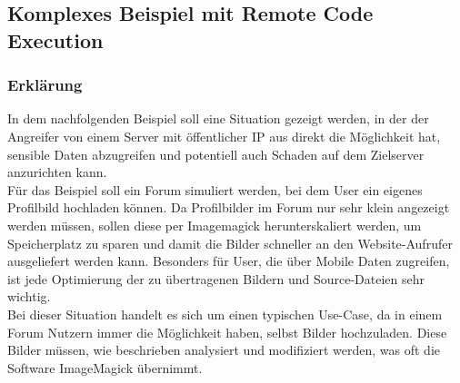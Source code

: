 
\subsection{Komplexes Beispiel mit Remote Code Execution}\label{subsec:komplexes-beispiel-mit-remote-code-execution}

\subsubsection{Erklärung}
In dem nachfolgenden Beispiel soll eine Situation gezeigt werden,
in der der Angreifer von einem Server mit öffentlicher IP aus direkt die Möglichkeit hat,
sensible Daten abzugreifen und potentiell auch Schaden auf dem Zielserver anzurichten kann.\\

Für das Beispiel soll ein Forum simuliert werden, bei dem User ein eigenes Profilbild hochladen können.
Da Profilbilder im Forum nur sehr klein angezeigt werden müssen,
sollen diese per Imagemagick herunterskaliert werden,
um Speicherplatz zu sparen und damit die Bilder schneller an den Website-Aufrufer ausgeliefert werden kann.
Besonders für User, die über Mobile Daten zugreifen,
ist jede Optimierung der zu übertragenen Bildern und Source-Dateien sehr wichtig.\\

Bei dieser Situation handelt es sich um einen typischen Use-Case,
da in einem Forum Nutzern immer die Möglichkeit haben, selbst Bilder hochzuladen.
Diese Bilder müssen, wie beschrieben analysiert und modifiziert werden,
was oft die Software ImageMagick übernimmt.